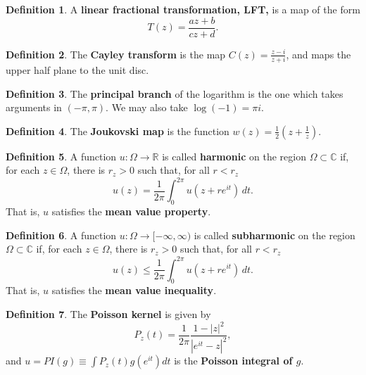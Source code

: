 \documentclass[12pt]{article}
\theoremstyle{definition}
\newtheorem{definition}{Definition}
\newcommand{\real}{\mathbb{R}}   %
\newcommand{\C}{\mathbb{C}}    %
\begin{document}
\begin{definition}
    A \textbf{linear fractional transformation, LFT,} is a map of the form
    \begin{equation*}
        T(z)=\frac{az+b}{cz+d}.
    \end{equation*}
\end{definition}

\begin{definition}
    The \textbf{Cayley transform} is the map $C(z)=\frac{z-i}{z+i}$, and maps the upper half plane to the unit disc.
\end{definition}

\begin{definition}
    The \textbf{principal branch} of the logarithm is the one which takes arguments in $(-\pi,\pi)$. We may also take $\log(-1)=\pi i$.
\end{definition}
\begin{definition}
    The \textbf{Joukovski map} is the function $w(z)=\frac{1}{2}\left(z+\frac{1}{z}\right)$.
\end{definition}

\newpage
\begin{definition}
    A function $u:\Omega\to\real$ is called \textbf{harmonic} on the region $\Omega\subset\C$ if, for each $z\in\Omega$, there is $r_z>0$ such that, for all $r<r_z$
    \begin{equation*}
        u(z)=\frac{1}{2\pi}\int_0^{2\pi}u(z+re^{it})\,dt.
    \end{equation*}
    That is, $u$ satisfies the \textbf{mean value property}.
\end{definition}

\begin{definition}
    A function $u:\Omega\to[-\infty,\infty)$ is called \textbf{subharmonic} on the region $\Omega\subset\C$ if, for each $z\in\Omega$, there is $r_z>0$ such that, for all $r<r_z$
    \begin{equation*}
        u(z)\leq\frac{1}{2\pi}\int_0^{2\pi}u(z+re^{it})\,dt.
    \end{equation*}
    That is, $u$ satisfies the \textbf{mean value inequality}.
\end{definition}

\begin{definition}
    The \textbf{Poisson kernel} is given by
    \begin{equation*}
        P_z(t)=\frac{1}{2\pi}\frac{1-|z|^2}{|e^{it}-z|^2},
    \end{equation*}
    and $u=PI(g)\equiv \int P_z(t)g(e^{it})dt$ is the \textbf{Poisson integral of $g$}.
\end{definition}
\end{document}
